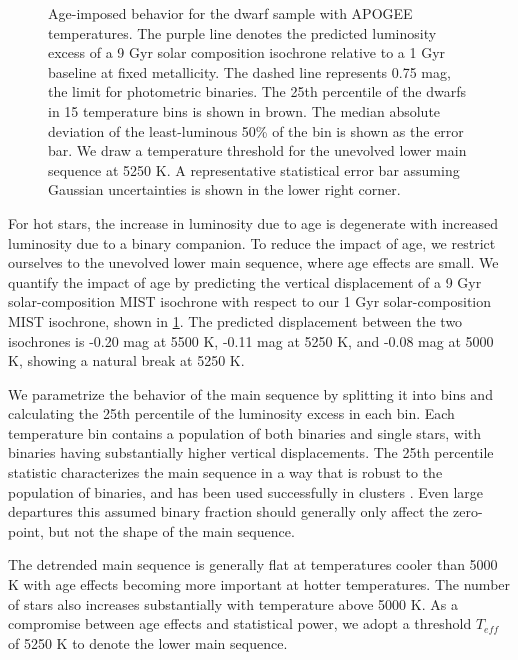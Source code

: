 \documentclass[manuscript]{aastex6}
\newcommand{\Teff}{\ensuremath{T_{eff}}}
\begin{document}
\begin{figure}[htb]
    \centering
    \caption{Age-imposed behavior for the dwarf sample with APOGEE
        temperatures. The purple line denotes the predicted luminosity excess of 
        a 9 Gyr solar composition isochrone relative to a 1 Gyr baseline at
        fixed metallicity. The dashed line represents 0.75 
        mag, the limit for photometric binaries. The 25th percentile of the 
        dwarfs in 15 temperature bins is shown in brown. The median absolute 
        deviation of the least-luminous 50\% of the bin is shown as the error 
        bar. We draw a temperature threshold for the unevolved lower main 
        sequence at 5250 K. A representative statistical error bar assuming 
        Gaussian uncertainties is shown in the lower right corner.}
    \label{fig:ages}
\end{figure}

For hot stars, the increase in luminosity due to age is degenerate with
increased luminosity due to a binary companion. To reduce the impact of age,
we restrict ourselves to the unevolved lower main sequence, where age
effects are small. We quantify the impact of age by predicting the vertical
displacement of a 9 Gyr solar-composition MIST isochrone with respect to our 
1 Gyr solar-composition MIST isochrone, shown in \cref{fig:ages}. The
predicted displacement between the two isochrones is -0.20 mag at 5500 K, 
-0.11 mag at 5250 K, and -0.08 mag at 5000 K, showing a natural break at 5250
K.

We parametrize the behavior of the main sequence by splitting it into bins
and calculating the 25th percentile of the luminosity excess in each bin. Each 
temperature bin contains a population of both binaries and single stars, with 
binaries having substantially higher vertical displacements. The 25th 
percentile statistic characterizes the main sequence in a way that is robust 
to the population of binaries, and has been used successfully in clusters 
\citep{An06}. Even large departures this assumed binary fraction should 
generally only affect the zero-point, but not the shape of the main sequence.

The detrended main sequence is generally flat at temperatures cooler than 5000 K 
with age effects becoming more important at hotter temperatures. The number of stars
also increases substantially with temperature above 5000 K. As a compromise
between age effects and statistical power, we adopt a threshold \Teff{} of 
5250 K to denote the lower main sequence.
\end{document}
